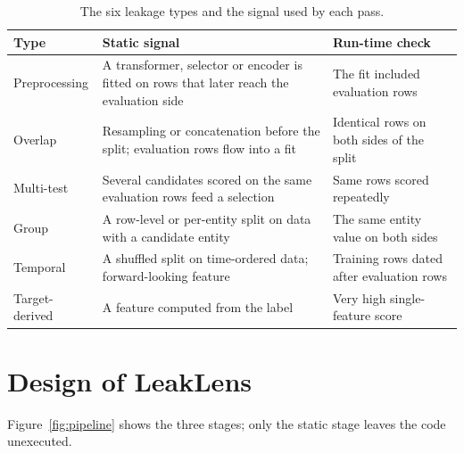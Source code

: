 \documentclass[10pt,a4paper,twocolumn]{article}
\begin{document}
\begin{table}[t]
\caption{The six leakage types and the signal used by each pass.}
\label{tab:types}
\footnotesize
\begin{tabularx}{\columnwidth}{@{}>{\raggedright\arraybackslash}p{}>{\raggedright\arraybackslash}X>{\raggedright\arraybackslash}X@{}}
\toprule
\textbf{Type} & \textbf{Static signal} & \textbf{Run-time check} \\
\midrule
Preprocessing & A transformer, selector or encoder is fitted on rows that later reach the evaluation side & The fit included evaluation rows \\
Overlap & Resampling or concatenation before the split; evaluation rows flow into a fit & Identical rows on both sides of the split \\
Multi-test & Several candidates scored on the same evaluation rows feed a selection & Same rows scored repeatedly \\
Group & A row-level or per-entity split on data with a candidate entity & The same entity value on both sides \\
Temporal & A shuffled split on time-ordered data; forward-looking feature & Training rows dated after evaluation rows \\
Target-derived & A feature computed from the label & Very high single-feature score \\
\bottomrule
\end{tabularx}
\end{table}

\section{Design of LeakLens}

Figure~\ref{fig:pipeline} shows the three stages; only the static stage leaves the code unexecuted.
\end{document}
